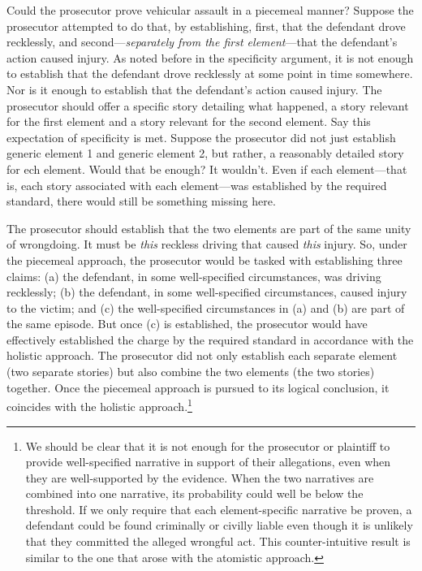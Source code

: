 \documentclass[
  10pt,
  dvipsnames,enabledeprecatedfontcommands]{scrartcl}
\begin{document}
Could the prosecutor prove vehicular assault in a piecemeal manner?
Suppose the prosecutor attempted to do that, by establishing, first,
that the defendant drove recklessly, and second---\emph{separately from
the first element}---that the defendant's action caused injury. As noted
before in the specificity argument, it is not enough to establish that
the defendant drove recklessly at some point in time somewhere. Nor is
it enough to establish that the defendant's action caused injury. The
prosecutor should offer a specific story detailing what happened, a
story relevant for the first element and a story relevant for the second
element. Say this expectation of specificity is met. Suppose the
prosecutor did not just establish generic element 1 and generic element
2, but rather, a reasonably detailed story for ech element. Would that
be enough? It wouldn't. Even if each element---that is, each story
associated with each element---was established by the required standard,
there would still be something missing here.

The prosecutor should establish that the two elements are part of the
same unity of wrongdoing. It must be \emph{this} reckless driving that
caused \emph{this} injury. So, under the piecemeal approach, the
prosecutor would be tasked with establishing three claims: (a) the
defendant, in some well-specified circumstances, was driving recklessly;
(b) the defendant, in some well-specified circumstances, caused injury
to the victim; and (c) the well-specified circumstances in (a) and (b)
are part of the same episode. But once (c) is established, the
prosecutor would have effectively established the charge by the required
standard in accordance with the holistic approach. The prosecutor did
not only establish each separate element (two separate stories) but also
combine the two elements (the two stories) together. Once the piecemeal
approach is pursued to its logical conclusion, it coincides with the
holistic approach.\footnote{We should be clear that it is not enough for
  the prosecutor or plaintiff to provide well-specified narrative in
  support of their allegations, even when they are well-supported by the
  evidence. When the two narratives are combined into one narrative, its
  probability could well be below the threshold. If we only require that
  each element-specific narrative be proven, a defendant could be found
  criminally or civilly liable even though it is unlikely that they
  committed the alleged wrongful act. This counter-intuitive result is
  similar to the one that arose with the atomistic approach.}
\end{document}
